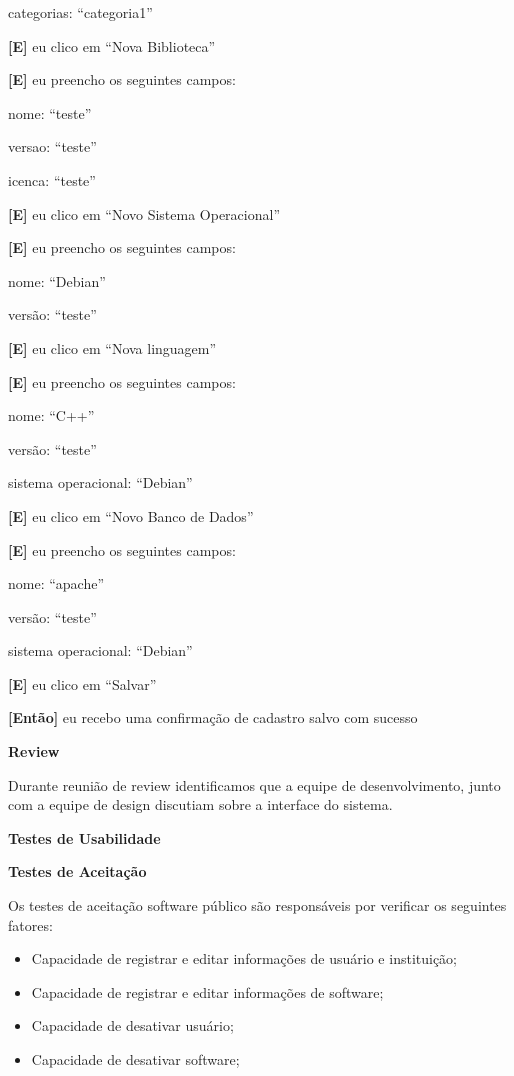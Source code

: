 \begin{itemize}
  		\subitem categorias: ``categoria1''
 	
 	\textbf{[E]} eu clico em ``Nova Biblioteca''

 	\textbf{[E]} eu preencho os seguintes campos: 

 		\subitem nome: ``teste''

 		\subitem versao: ``teste''

 		\subitem icenca: ``teste''

 	\textbf{[E]} eu clico em ``Novo Sistema Operacional''

 	\textbf{[E]} eu preencho os seguintes campos: 

 		\subitem nome: ``Debian''

 		\subitem versão: ``teste''

 	\textbf{[E]} eu clico em ``Nova linguagem''

 	\textbf{[E]} eu preencho os seguintes campos: 

 		\subitem nome: ``C++''

 		\subitem versão: ``teste''

 		\subitem sistema operacional: ``Debian''

 	\textbf{[E]} eu clico em ``Novo Banco de Dados''

 	\textbf{[E]} eu preencho os seguintes campos: 

 		\subitem nome: ``apache''

 		\subitem versão: ``teste''

 		\subitem sistema operacional: ``Debian''

	\textbf{[E]} eu clico em ``Salvar''

	\textbf{[Então]} eu recebo uma confirmação de cadastro salvo com sucesso
	
	
\end{itemize}

\textbf{Review}

Durante reunião de review identificamos que a equipe de desenvolvimento, junto com a equipe de design discutiam sobre a interface do sistema. %

\textbf{Testes de Usabilidade}

 


\textbf{Testes de Aceitação}

Os testes de aceitação software público são responsáveis por verificar os seguintes fatores:

\begin{itemize}
	\item Capacidade de registrar e editar informações de usuário e instituição;
	\item Capacidade de registrar e editar informações de software;
	\item Capacidade de desativar usuário;
	\item Capacidade de desativar software;
\end{itemize}


